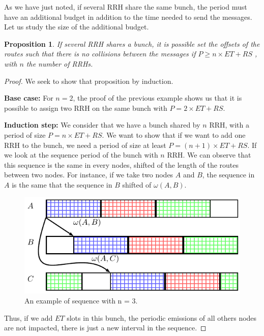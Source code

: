 \documentclass[]{algotel}
\newtheorem{prop}{Proposition}
\begin{document}
 
 
 As we have just noted, if several RRH share the same bunch, the period must have an additional budget in addition to the time needed to send the messages. Let us study the size of the additional budget.
 \begin{prop}
 If several RRH shares a bunch, it is possible set the offsets of the routes such that there is no collisions between the messages if $P \ge n\times ET + RS$ , with $n$ the number of RRHs.
 \end{prop}
 \begin{proof}
 We seek to show that proposition by induction.
 
 {\bf Base case:} For $n = 2$, the proof of the previous example shows us that it is possible to assign two RRH on the same bunch with $P = 2\times ET + RS$.
 
 {\bf Induction step:}  We consider that we have a bunch shared by $n$ RRH, with a period of size $P= n\times ET + RS$. We want to show that if we want to add one RRH to the bunch, we need a period of size at least $P = (n+1)\times ET + RS$. If we look at the sequence period of the bunch with $n$ RRH. We can observe that this sequence is the same in every nodes, shifted of the length of the routes between two nodes. For instance, if we take two nodes $A$ and $B$, the sequence in $A$ is the same that the sequence in $B$ shifted of $\omega(A,B)$.
 
   \begin{figure}[h]
\centering
      \includegraphics[scale=0.7]{period1.pdf}
     \caption{An example of sequence with n = 3.}   \label{fig:proofperiod1}
  \end{figure}
   
 Thus, if we add $ET$ slots in this bunch, the periodic emissions of all others nodes are not impacted, there is just a new interval in the sequence.
 

\end{proof}
\end{document}
